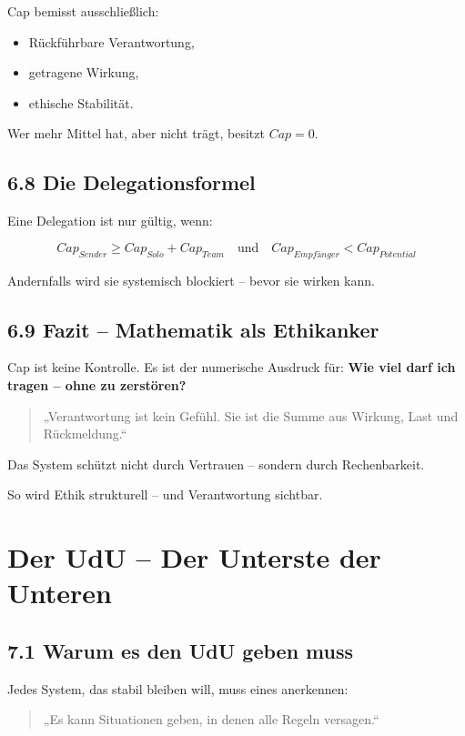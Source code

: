 \documentclass[12pt,a4paper]{book}
\begin{document}
Cap bemisst ausschließlich:

\begin{itemize}
    \item Rückführbare Verantwortung,
    \item getragene Wirkung,
    \item ethische Stabilität.
\end{itemize}

Wer mehr Mittel hat, aber nicht trägt, besitzt $Cap = 0$.

\section*{6.8 Die Delegationsformel}

Eine Delegation ist nur gültig, wenn:

\[
Cap_{Sender} \geq Cap_{Solo} + Cap_{Team} \quad \text{und} \quad Cap_{Empfänger} < Cap_{Potential}
\]

Andernfalls wird sie systemisch blockiert – bevor sie wirken kann.

\section*{6.9 Fazit – Mathematik als Ethikanker}

Cap ist keine Kontrolle.  
Es ist der numerische Ausdruck für: \textbf{Wie viel darf ich tragen – ohne zu zerstören?}

\begin{quote}
„Verantwortung ist kein Gefühl.  
Sie ist die Summe aus Wirkung, Last und Rückmeldung.“  
\end{quote}

Das System schützt nicht durch Vertrauen – sondern durch Rechenbarkeit.

So wird Ethik strukturell –  
und Verantwortung sichtbar.

\chapter{Der UdU – Der Unterste der Unteren}

\section*{7.1 Warum es den UdU geben muss}

Jedes System, das stabil bleiben will, muss eines anerkennen:

\begin{quote}
„Es kann Situationen geben, in denen alle Regeln versagen.“  
\end{quote}
\end{document}
